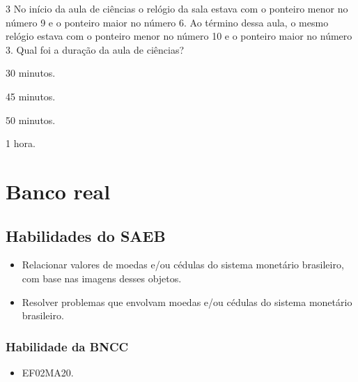 \num{3} No início da aula de ciências o relógio da sala estava com o ponteiro
menor no número 9 e o ponteiro maior no número 6. Ao término dessa
aula, o mesmo relógio estava com o ponteiro menor no número
10 e o ponteiro maior no número 3. Qual foi a duração da aula de
ciências?

\begin{escolha}[itemsep=-5pt]
\item 30 minutos.

\item 45 minutos.

\item 50 minutos.

\item 1 hora.
\end{escolha}

\chapter{Banco real}


\section*{Habilidades do SAEB}

\begin{itemize}
\item Relacionar valores de moedas e/ou cédulas do sistema monetário
brasileiro, com base nas imagens desses objetos.

\item Resolver problemas que envolvam moedas e/ou cédulas do sistema
monetário brasileiro.
\end{itemize}

\subsection{Habilidade da BNCC}

\begin{itemize}
\item EF02MA20.
\end{itemize}


